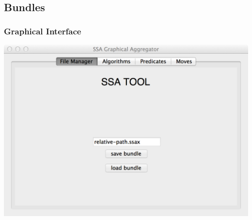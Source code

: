 \documentclass[
]{beamer}
\begin{document}
\subsection{Bundles}
\begin{frame}
  \frametitle{Graphical Interface}
  \centering
  \includegraphics[width=\textwidth]{../figs/3-2}
\end{frame}

\end{document}
